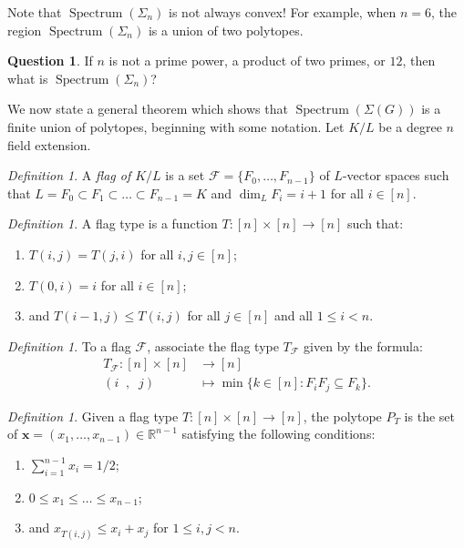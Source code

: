 \documentclass[letterpaper,10pt]{amsart}
\DeclareMathOperator{\Spe}{Spectrum}
\newcommand{\RR}{\mathbb{R}}      %
\newcommand{\cF}{\mathcal{F}}
\theoremstyle{definition}
\newtheorem{question}[theorem]{Question}
\theoremstyle{remark}
\newtheorem{definition}[theorem]{Definition}
\begin{document}
Note that $\Spe(\Sigma_n)$ is not always convex! For example, when $n = 6$, the region $\Spe(\Sigma_n)$ is a union of two polytopes. 

\begin{question}
If $n$ is not a prime power, a product of two primes, or $12$, then what is $\Spe(\Sigma_n)$?
\end{question}

We now state a general theorem which shows that $\Spe(\Sigma(G))$ is a finite union of polytopes, beginning with some notation. Let $K/L$ be a degree $n$ field extension.

\begin{definition}
\label{def:flag}
A \emph{flag of $K/L$} is a set $\cF = \{F_0,\dots,F_{n-1}\}$ of $L$-vector spaces such that $L = F_0 \subset F_1 \subset \dots \subset F_{n-1} = K$ and $\dim_{L} F_i = i + 1$ for all $i \in [n]$.  
\end{definition}

\begin{definition}
\label{def:flag-type}
A flag type is a function $T \colon [n]\times[n] \rightarrow [n]$ such that:
\begin{enumerate}
    \item $T(i,j) = T(j,i)$ for all $i,j \in [n]$;
    \item $T(0,i) = i$ for all $i \in [n]$;
    \item and $T(i-1,j) \leq T(i,j)$ for all $j \in [n]$ and all $1 \leq i < n$.
\end{enumerate}
\end{definition}

\begin{definition}
\label{def:tf}
To a flag $\cF$, associate the flag type $T_{\cF}$ given by the formula: 
\begin{align*}
  T_{\cF} \colon [n]\times[n] & \longrightarrow [n] \\
  (i\;\;,\;\;j ) \; & \longmapsto \min\{k \in [n] : F_iF_j \subseteq F_k\}.
\end{align*}
\end{definition}


\begin{definition}
\label{def:ptf}
Given a flag type $T \colon [n]\times[n] \rightarrow [n]$, the polytope $P_{T}$ is the set of $\mathbf{x} = (x_1,\dots,x_{n-1}) \in \RR^{n-1}$ satisfying the following conditions:
\begin{enumerate}
\item $\sum_{i=1}^{n-1} x_i = 1/2$;
\item $0 \leq x_1 \leq \dots \leq x_{n-1}$;
\item and $x_{T(i,j)} \leq x_i + x_j$ for $1 \leq i,j < n$.
\end{enumerate}
\end{definition}
\end{document}
